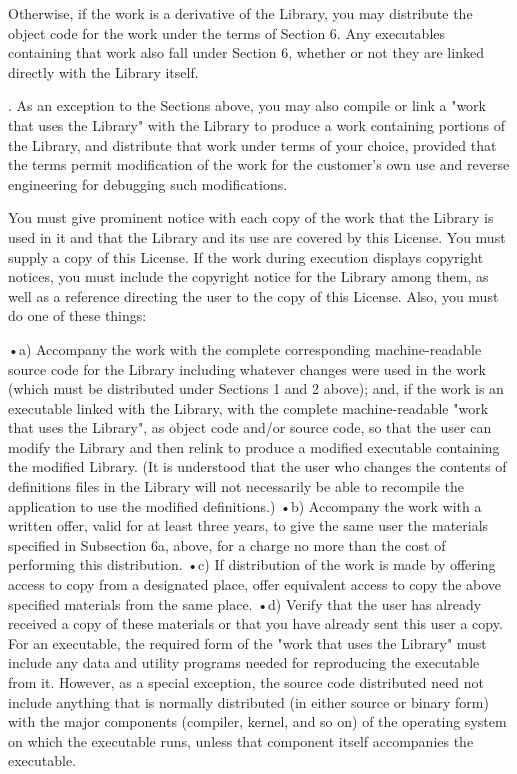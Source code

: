 Otherwise, if the work is a derivative of the Library, you may distribute the object code for the work under the terms of Section 6. Any executables containing that work also fall under Section 6, whether or not they are linked directly with the Library itself. 

. As an exception to the Sections above, you may also compile or link a "work that uses the Library" with the Library to produce a work containing portions of the Library, and distribute that work under terms of your choice, provided that the terms permit modification of the work for the customer's own use and reverse engineering for debugging such modifications. 

You must give prominent notice with each copy of the work that the Library is used in it and that the Library and its use are covered by this License. You must supply a copy of this License. If the work during execution displays copyright notices, you must include the copyright notice for the Library among them, as well as a reference directing the user to the copy of this License. Also, you must do one of these things: 

•a) Accompany the work with the complete corresponding machine-readable source code for the Library including whatever changes were used in the work (which must be distributed under Sections 1 and 2 above); and, if the work is an executable linked with the Library, with the complete machine-readable "work that uses the Library", as object code and/or source code, so that the user can modify the Library and then relink to produce a modified executable containing the modified Library. (It is understood that the user who changes the contents of definitions files in the Library will not necessarily be able to recompile the application to use the modified definitions.) 
•b) Accompany the work with a written offer, valid for at least three years, to give the same user the materials specified in Subsection 6a, above, for a charge no more than the cost of performing this distribution. 
•c) If distribution of the work is made by offering access to copy from a designated place, offer equivalent access to copy the above specified materials from the same place. 
•d) Verify that the user has already received a copy of these materials or that you have already sent this user a copy. 
For an executable, the required form of the "work that uses the Library" must include any data and utility programs needed for reproducing the executable from it. However, as a special exception, the source code distributed need not include anything that is normally distributed (in either source or binary form) with the major components (compiler, kernel, and so on) of the operating system on which the executable runs, unless that component itself accompanies the executable. 

